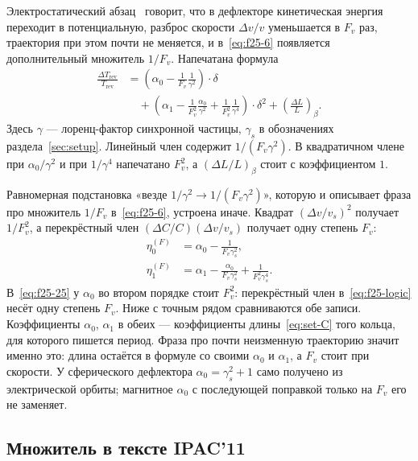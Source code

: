 Электростатический абзац~\cite{Senichev2013} говорит, что в дефлекторе кинетическая энергия переходит в потенциальную, разброс скорости $\Delta v/v$ уменьшается в $F_v$ раз, траектория при этом почти не меняется, и в~\eqref{eq:f25-6} появляется дополнительный множитель $1/F_v$. Напечатана формула
\begin{align}
\frac{\Delta T_{\mathrm{rev}}}{T_{\mathrm{rev}}}
&=
\left(\alpha_0-\frac{1}{F_v}\frac{1}{\gamma^2}\right)\cdot\delta
\nonumber\\
&\quad
+
\left(
\alpha_1
-
\frac{1}{F_v^2}\frac{\alpha_0}{\gamma^2}
+
\frac{1}{F_v^2}\frac{1}{\gamma^4}
\right)\cdot\delta^2
+
\left(\frac{\Delta L}{L}\right)_{\!\beta}.
\label{eq:f25-25}
\end{align}
Здесь $\gamma$ --- лоренц-фактор синхронной частицы, $\gamma_s$ в обозначениях раздела~\ref{sec:setup}. Линейный член содержит $1/(F_v\gamma^2)$. В квадратичном члене при $\alpha_0/\gamma^2$ и при $1/\gamma^4$ напечатано $F_v^2$, а $(\Delta L/L)_\beta$ стоит с коэффициентом $1$.

Равномерная подстановка «везде $1/\gamma^2\to 1/(F_v\gamma^2)$», которую и описывает фраза про множитель $1/F_v$ в~\eqref{eq:f25-6}, устроена иначе. Квадрат $(\Delta v/v_s)^2$ получает $1/F_v^2$, а перекрёстный член $(\Delta C/C)(\Delta v/v_s)$ получает одну степень $F_v$:
\begin{equation}
\label{eq:f25-logic}
\begin{aligned}
\eta_0^{(F)}
&=
\alpha_0-\frac{1}{F_v\gamma_s^2},
\\
\eta_1^{(F)}
&=
\alpha_1-\frac{\alpha_0}{F_v\gamma_s^2}+\frac{1}{F_v^2\gamma_s^4}.
\end{aligned}
\end{equation}
В~\eqref{eq:f25-25} у $\alpha_0$ во втором порядке стоит $F_v^2$: перекрёстный член в~\eqref{eq:f25-logic} несёт одну степень $F_v$. Ниже с точным рядом сравниваются обе записи. Коэффициенты $\alpha_0$, $\alpha_1$ в обеих --- коэффициенты длины~\eqref{eq:set-C} того кольца, для которого пишется период. Фраза про почти неизменную траекторию значит именно это: длина остаётся в формуле со своими $\alpha_0$ и $\alpha_1$, а $F_v$ стоит при скорости. У сферического дефлектора $\alpha_0=\gamma_s^2+1$ само получено из электрической орбиты; магнитное $\alpha_0$ с последующей поправкой только на $F_v$ его не заменяет.

\subsection{Множитель в тексте IPAC'11}
\label{sec:f25-k}


